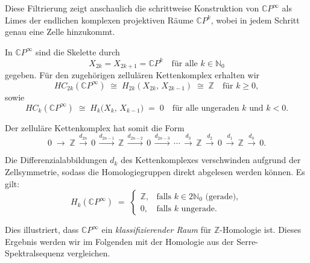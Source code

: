 \documentclass[12pt]{article}
\numberwithin{conj}{section}
\begin{document}
    Diese Filtrierung zeigt anschaulich die schrittweise Konstruktion von $\mathbb{C}
    P^{\infty}$ als Limes der endlichen komplexen projektiven Räume $\mathbb{C}P^{k}$,
    wobei in jedem Schritt genau eine Zelle hinzukommt.

    In $\mathbb{C}P^{\infty}$ sind die Skelette durch
    \[
        X_{2k}= X_{2k+1}= \mathbb{C}P^{k} \quad \text{für alle }k \in \mathbb{N}_{0}
    \]
    gegeben. Für den zugehörigen zellulären Kettenkomplex erhalten wir
    \[
        HC_{2k}(\mathbb{C}P^{\infty}) \;\cong\; H_{2k}(X_{2k},\,X_{2k-1})
          \;\cong\; \mathbb{Z}\quad \text{für }k \geq 0,
    \]
    sowie
    \[
        HC_{k}(\mathbb{C}P^{\infty}) \;\cong\; H_{k}\bigl(X_{k},\,X_{k-1}\bigr
        ) \;=\; 0 \quad \text{für alle ungeraden }k \text{ und }k < 0.
    \]

    Der zelluläre Kettenkomplex hat somit die Form
    \[
        0 \;\longrightarrow\; \mathbb{Z}\,\xrightarrow{d_{2n}}\, 0 \,\xrightarrow{d_{2n-1}}
        \, \mathbb{Z}\,\xrightarrow{d_{2n-2}}\, 0 \,\xrightarrow{d_{2n-3}}\, \cdots \,
        \xrightarrow{d_3}\, \mathbb{Z}\,\xrightarrow{d_2}\, 0 \,\xrightarrow{d_1}\, \mathbb{Z}
        \,\xrightarrow{d_0}\, 0.
    \]

    Die Differenzialabbildungen $d_{k}$ des Kettenkomplexes verschwinden aufgrund
    der Zellsymmetrie, sodass die Homologiegruppen direkt abgelesen werden können.
    Es gilt:
    \[
        H_{k}(\mathbb{C}P^{\infty}) \;=\;
        \begin{cases}
            \mathbb{Z}, & \text{falls }k \in 2\mathbb{N}_{0} \text{ (gerade)}, \\
            0,          & \text{falls }k \text{ ungerade}.
        \end{cases}
    \]

    Dies illustriert, dass $\mathbb{C}P^{\infty}$ ein \textit{klassifizierender Raum} für $\mathbb{Z}$-Homologie ist. Dieses Ergebnis werden wir im Folgenden mit der Homologie aus der Serre-Spektralsequenz
    vergleichen.
    \smallskip
\end{document}
